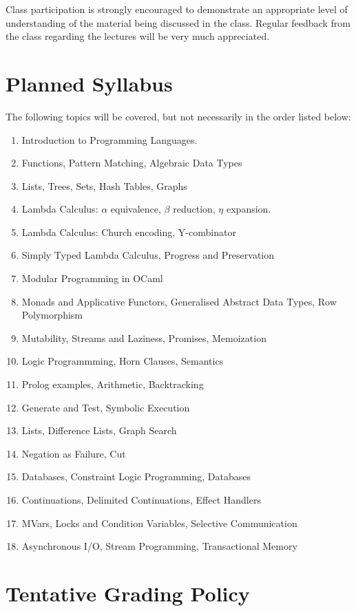 \documentclass[10pt]{article}
\begin{document}
Class participation is strongly encouraged to demonstrate an appropriate level
of understanding of the material being discussed in the class.  Regular
feedback from the class regarding the lectures will be very much appreciated.

\section{Planned Syllabus}

The following topics will be covered, but not necessarily in the order
listed below:

\begin{enumerate}
\item Introduction to Programming Languages.
\item Functions, Pattern Matching, Algebraic Data Types
\item Lists, Trees, Sets, Hash Tables, Graphs
\item Lambda Calculus: $\alpha$ equivalence, $\beta$ reduction, $\eta$ expansion.
\item Lambda Calculus: Church encoding, Y-combinator
\item Simply Typed Lambda Calculus, Progress and Preservation
\item Modular Programming in OCaml
\item Monads and Applicative Functors, Generalised Abstract Data Types, Row
	Polymorphism
\item Mutability, Streams and Laziness, Promises, Memoization
\item Logic Programmming, Horn Clauses, Semantics
\item Prolog examples, Arithmetic, Backtracking
\item Generate and Test, Symbolic Execution
\item Lists, Difference Lists, Graph Search
\item Negation as Failure, Cut
\item Databases, Constraint Logic Programming, Databases
\item Continuations, Delimited Continuations, Effect Handlers
\item MVars, Locks and Condition Variables, Selective Communication
\item Asynchronous I/O, Stream Programming, Transactional Memory
\end{enumerate}

\section{Tentative Grading Policy}
\end{document}
